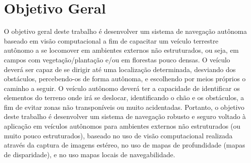 \section{Objetivo Geral}
\label{sec:obj_geral}

O objetivo geral deste trabalho é desenvolver um sistema de navegação autônoma baseado
em visão computacional a fim de capacitar um veículo terrestre autônomo a se locomover em
ambientes externos não estruturados, ou seja, em campos com vegetação/plantação e/ou em
florestas pouco densas. O veículo deverá ser capaz de se dirigir até uma localização determinada,
desviando dos obstáculos, percebendo-os de forma autônoma, e escolhendo por meios próprios o
caminho a seguir. O veículo autônomo deverá ter a capacidade de identificar os elementos do terreno
onde irá se deslocar, identificando o chão e os obstáculos, a fim de evitar zonas não transponíveis ou
muito acidentadas. Portanto, o objetivo deste trabalho é desenvolver um sistema de navegação
robusto e seguro voltado à aplicação em veículos autônomos para ambientes externos não
estruturados (ou muito pouco estruturados), baseado no uso de visão computacional realizada
através da captura de imagens estéreo, no uso de mapas de profundidade (mapas de disparidade), e
no uso mapas locais de navegabilidade.

